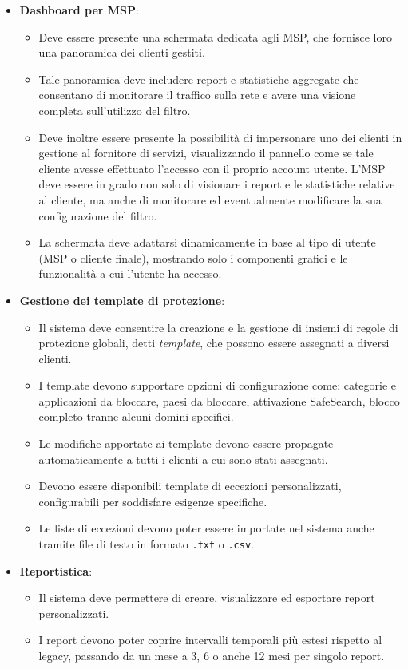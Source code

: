 \begin{itemize}
  \item \textbf{Dashboard per MSP}:
    \begin{itemize}
      \item Deve essere presente una schermata dedicata agli MSP, che fornisce loro una panoramica dei clienti gestiti.
      \item Tale panoramica deve includere report e statistiche aggregate che consentano di monitorare il traffico sulla rete e avere una visione completa sull'utilizzo del filtro.
      \item Deve inoltre essere presente la possibilità di impersonare uno dei clienti in gestione al fornitore di servizi, visualizzando il pannello come se tale cliente avesse effettuato l'accesso con il proprio account utente. L’MSP deve essere in grado non solo di visionare i report e le statistiche relative al cliente, ma anche di monitorare ed eventualmente modificare la sua configurazione del filtro.
      \item La schermata deve adattarsi dinamicamente in base al tipo di utente (MSP o cliente finale), mostrando solo i componenti grafici e le funzionalità a cui l’utente ha accesso.
    \end{itemize}

  \item \textbf{Gestione dei template di protezione}:
    \begin{itemize}
      \item Il sistema deve consentire la creazione e la gestione di insiemi di regole di protezione globali, detti \emph{template}, che possono essere assegnati a diversi clienti.
      \item I template devono supportare opzioni di configurazione come: categorie e applicazioni da bloccare, paesi da bloccare, attivazione SafeSearch, blocco completo tranne alcuni domini specifici.
      \item Le modifiche apportate ai template devono essere propagate automaticamente a tutti i clienti a cui sono stati assegnati.
      \item Devono essere disponibili template di eccezioni personalizzati, configurabili per soddisfare esigenze specifiche.
      \item Le liste di eccezioni devono poter essere importate nel sistema anche tramite file di testo in formato \texttt{.txt} o \texttt{.csv}.
    \end{itemize}

  \item \textbf{Reportistica}:
    \begin{itemize}
      \item Il sistema deve permettere di creare, visualizzare ed esportare report personalizzati.
      \item I report devono poter coprire intervalli temporali più estesi rispetto al legacy, passando da un mese a 3, 6 o anche 12 mesi per singolo report.
    \end{itemize}


\end{itemize}
